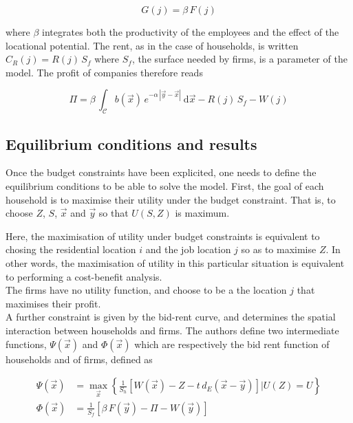 \begin{equation}
    G(j) = \beta\,F(j)
\end{equation}

where $\beta$ integrates both the productivity of the employees and the effect
of the locational potential. The rent, as
in the case of households, is written $C_R(j) = R(j)\,S_f$ where $S_f$, the
surface needed by firms, is a parameter of the model. The profit
of companies therefore reads

\begin{equation}
    \Pi = \beta\, \int_{\mathcal{C}} b(\vec{x})\,e^{-\alpha\,\left|\vec{y}-\vec{x}\right|}\:\mathrm{d}\vec{x}
        - R\left(j\right)\,S_f
        - W\left(j\right)
\end{equation}


\subsection{Equilibrium conditions and results}
\label{sub:equilibrium_conditions}

Once the budget constraints have been explicited, one needs to define
the equilibrium conditions to be able to solve the model. First, the goal of
each household is to maximise their utility under the budget constraint. That
is, to choose $Z$, $S$, $\vec{x}$ and $\vec{y}$ so that $U(S,Z)$ is maximum.

Here, the maximisation of utility under budget constraints is
equivalent to chosing the residential location $i$ and the job location $j$ so
as to maximise $Z$. In other words, the maximisation of utility in this
particular situation is equivalent to performing a cost-benefit analysis.\\ 

The firms have no utility function, and choose to be a the location $j$ that
maximises their profit.\\

A further constraint is given by the bid-rent curve, and determines the spatial
interaction between households and firms. The authors define two intermediate
functions, $\Psi(\vec{x})$ and $\Phi(\vec{x})$ which are respectively the bid
rent function of households and of firms, defined as

\begin{align}
    \Psi\left(\vec{x}\right) &= \max_{\vec{x}} \left\{ \frac{1}{S_h} \left[W(\vec{x} ) - Z -
    t\,d_E\left(\vec{x}-\vec{y}\right)\right] | U(Z) = U\right\}\\
    \Phi\left(\vec{x}\right) &= \frac{1}{S_f} \left[\beta\,F(\vec{y}) - \Pi -
W(\vec{y})\right]
\end{align}

